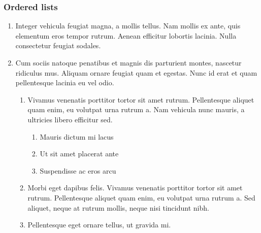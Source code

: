 \documentclass[letterpaper,10pt,english]{sphinxmanual}
\begin{document}
\subsubsection{Ordered lists}
\label{\detokenize{markdown:ordered-lists}}\begin{enumerate}
%
\item {} 
Integer vehicula feugiat magna, a mollis tellus. Nam mollis ex ante, quis
elementum eros tempor rutrum. Aenean efficitur lobortis lacinia. Nulla
consectetur feugiat sodales.

\item {} 
Cum sociis natoque penatibus et magnis dis parturient montes, nascetur
ridiculus mus. Aliquam ornare feugiat quam et egestas. Nunc id erat et quam
pellentesque lacinia eu vel odio.
\begin{enumerate}
%
\item {} 
Vivamus venenatis porttitor tortor sit amet rutrum. Pellentesque aliquet
quam enim, eu volutpat urna rutrum a. Nam vehicula nunc mauris, a
ultricies libero efficitur sed.
\begin{enumerate}
%
\item {} 
Mauris dictum mi lacus

\item {} 
Ut sit amet placerat ante

\item {} 
Suspendisse ac eros arcu

\end{enumerate}

\item {} 
Morbi eget dapibus felis. Vivamus venenatis porttitor tortor sit amet
rutrum. Pellentesque aliquet quam enim, eu volutpat urna rutrum a. Sed
aliquet, neque at rutrum mollis, neque nisi tincidunt nibh.

\item {} 
Pellentesque eget  ornare tellus, ut gravida mi.

\end{enumerate}

\begin{sphinxVerbatim}[commandchars=\\\{\}]
    
           
       \PYG{p}{[}\PYG{p}{]}
         
      \PYG{p}{[}\PYG{p}{]}  \PYG{p}{[}\PYG{p}{]}
   
\end{sphinxVerbatim}


\end{enumerate}
\end{document}
